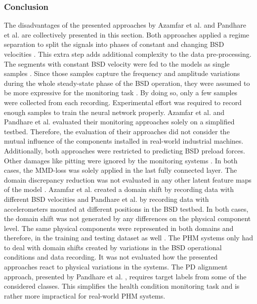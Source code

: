 \subsubsection{Conclusion}
The disadvantages of the presented approaches by Azamfar et al. \cite{AZAMFAR2020103932} and Pandhare et al. \cite{Pandhare2021} are collectively presented in this section. Both approaches applied a regime separation to split the signals into phases of constant and changing BSD velocities \cite{Pandhare2021} \cite{AZAMFAR2020103932} . This extra step adds additional complexity to the data pre-processing. The segments with constant BSD velocity were fed to the models as single samples \cite{Pandhare2021} \cite{AZAMFAR2020103932}. Since those samples capture the frequency and amplitude variations during the whole steady-state phase of the BSD operation, they were assumed to be more expressive for the monitoring task \cite{AZAMFAR2020103932}. By doing so, only a few samples were collected from each recording. Experimental effort was required to record enough samples to train the neural network properly. Azamfar et al. \cite{AZAMFAR2020103932} and Pandhare et al. \cite{Pandhare2021} evaluated their monitoring approaches solely on a simplified testbed. Therefore, the evaluation of their approaches did not consider the mutual influence of the components installed in real-world industrial machines. Additionally, both approaches were restricted to predicting BSD preload forces. Other damages like pitting were ignored by the monitoring systems \cite{Pandhare2021} \cite{AZAMFAR2020103932}. In both cases, the MMD-loss was solely applied in the last fully connected layer. The domain discrepancy reduction was not evaluated in any other latent feature maps of the model \cite{Pandhare2021} \cite{AZAMFAR2020103932}. Azamfar et al. \cite{AZAMFAR2020103932} created a domain shift by recording data with different BSD velocities and Pandhare et al. \cite{Pandhare2021} by recording data with accelerometers mounted at different positions in the BSD testbed. In both cases, the domain shift was not generated by any differences on the physical component level. The same physical components were represented in both domains and therefore, in the training and testing dataset as well \cite{Pandhare2021} \cite{AZAMFAR2020103932}. The PHM systems only had to deal with domain shifts created by variations in the BSD operational conditions and data recording. It was not evaluated how the presented approaches react to physical variations in the systems. The PD alignment approach, presented by Pandhare et al. \cite{Pandhare2021}, requires target labels from some of the considered classes. This simplifies the health condition monitoring task and is rather more impractical for real-world PHM systems.

